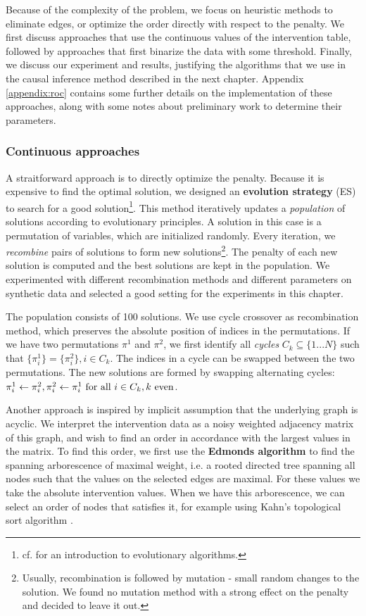 Because of the complexity of the problem, we focus on heuristic methods to eliminate edges, or optimize the order directly with respect to the penalty. We first discuss approaches that use the continuous values of the intervention table, followed by approaches that first binarize the data with some threshold. Finally, we discuss our experiment and results, justifying the algorithms that we use in the causal inference method described in the next chapter. Appendix \ref{appendix:roc} contains some further details on the implementation of these approaches, along with some notes about preliminary work to determine their parameters.

\subsubsection{Continuous approaches}

A straitforward approach is to directly optimize the penalty. Because it is expensive to find the optimal solution, we designed an \textbf{evolution strategy} (ES) to search for a good solution\footnote{cf. \citet{eiben2003introduction} for an introduction to evolutionary algorithms.}. This method iteratively updates a \textit{population} of solutions according to evolutionary principles. A solution in this case is a permutation of variables, which are initialized randomly. Every iteration, we \textit{recombine} pairs of solutions to form new solutions\footnote{Usually, recombination is followed by mutation - small random changes to the solution. We found no mutation method with a strong effect on the penalty and decided to leave it out.}. The penalty of each new solution is computed and the best solutions are kept in the population. We experimented with different recombination methods and different parameters on synthetic data and selected a good setting for the experiments in this chapter. 

The population consists of 100 solutions. We use cycle crossover \citep{oliver1987study} as recombination method, which preserves the absolute position of indices in the permutations. If we have two permutations $\pi^1$ and $\pi^2$, we first identify all \textit{cycles} $C_k \subseteq \{1...N \}$ such that $\{\pi^1_i \} = \{\pi^2_i \}, i\in C_k$. The indices in a cycle can be swapped between the two permutations. The new solutions are formed by swapping alternating cycles: $\pi^1_i \leftarrow \pi^2_i, \pi^2_i \leftarrow \pi^1_i \text{ for all } i\in C_k, k \text{ even}$.

Another approach is inspired by implicit assumption that the underlying graph is acyclic. We interpret the intervention data as a noisy weighted adjacency matrix of this graph, and wish to find an order in accordance with the largest values in the matrix. To find this order, we first use the \textbf{Edmonds algorithm} \citep{edmonds1967optimum} to find the spanning arborescence of maximal weight, i.e. a rooted directed tree spanning all nodes such that the values on the selected edges are maximal. For these values we take the absolute intervention values. When we have this arborescence, we can select an order of nodes that satisfies it, for example using Kahn's topological sort algorithm \citep{kahn1962topological}. 

